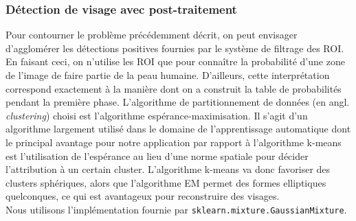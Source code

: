 \documentclass[a4paper,11pt]{article}
\begin{document}
\subsubsection{Détection de visage avec post-traitement}
Pour contourner le problème précédemment décrit, on peut envisager d'agglomérer les détections positives fournies par le système de filtrage des ROI.
En faisant ceci, on n'utilise les ROI que pour connaître la probabilité d'une zone de l'image de faire partie de la peau humaine.
D'ailleurs, cette interprétation correspond exactement à la manière dont on a construit la table de probabilités pendant la première phase.
\newline
\newline
L'algorithme de partitionnement de données (en angl. {\textit{clustering}}) choisi est l'algorithme espérance-maximisation.
Il s'agit d'un algorithme largement utilisé dans le domaine de l'apprentissage automatique dont le principal avantage pour notre application par rapport à l'algorithme k-means est l'utilisation de l'espérance au lieu d'une norme spatiale pour décider l'attribution à un certain cluster.
L'algorithme k-means va donc favoriser des clusters sphériques, alors que l'algorithme EM permet des formes elliptiques quelconques, ce qui est avantageux pour reconstruire des visages.\\
Nous utilisons l'implémentation fournie par \verb!sklearn.mixture.GaussianMixture!.
\newline
\end{document}
